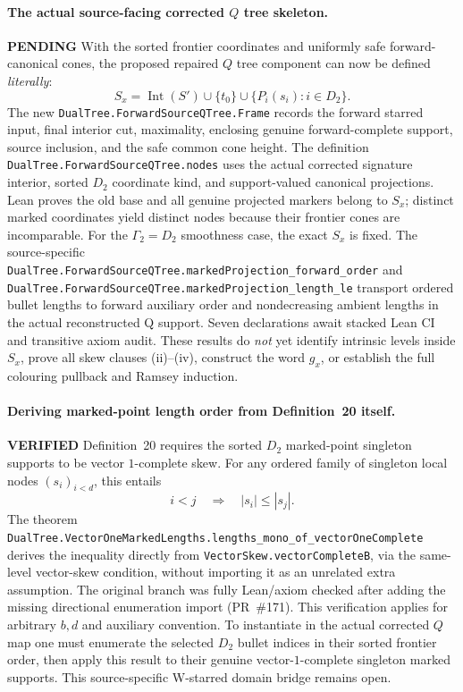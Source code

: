 \documentclass[11pt]{article}
\newcommand{\ok}{\textcolor{green!40!black}{\textbf{VERIFIED}}}
\newcommand{\todo}{\textcolor{gray!70!black}{\textbf{PENDING}}}
\newcommand{\lean}[1]{\texttt{#1}}
\begin{document}
\paragraph{The actual source-facing corrected $Q$ tree skeleton.} \todo
With the sorted frontier coordinates and
uniformly safe forward-canonical cones,
the proposed repaired $Q$ tree component
can now be defined \emph{literally}:
\[
 S_x=\operatorname{Int}(S')\cup\{t_0\}
 \cup\{P_i(s_i):i\in D_2\}.
\]
The new
\lean{DualTree.ForwardSourceQTree.Frame}
records the forward starred input,
final interior cut, maximality,
enclosing genuine forward-complete
support, source inclusion, and
the safe common cone height.
The definition
\lean{DualTree.ForwardSourceQTree.nodes}
uses the actual corrected signature
interior, sorted $D_2$ coordinate
kind, and support-valued canonical
projections.
Lean proves the old base and all
genuine projected markers belong
to $S_x$; distinct marked coordinates
yield distinct nodes because their
frontier cones are incomparable.
For the $\Gamma_2=D_2$ smoothness
case, the exact $S_x$ is fixed.
The source-specific
\lean{DualTree.ForwardSourceQTree.markedProjection_forward_order}
and
\lean{DualTree.ForwardSourceQTree.markedProjection_length_le}
transport ordered bullet lengths
to forward auxiliary order and
nondecreasing ambient lengths in
the actual reconstructed Q support.
Seven declarations await stacked
Lean CI and transitive axiom audit.
These results do \emph{not}
yet identify intrinsic levels
inside $S_x$, prove all skew
clauses (ii)--(iv), construct
the word $g_x$, or establish
the full colouring pullback
and Ramsey induction.

\paragraph{Deriving marked-point length order from Definition~20 itself.} \ok
Definition~20 requires the sorted $D_2$ marked-point
singleton supports to be vector $1$-complete skew.
For any ordered family of singleton local nodes
$(s_i)_{i<d}$, this entails
\[
 i<j\quad\Longrightarrow\quad |s_i|\le |s_j|.
\]
The theorem
\lean{DualTree.VectorOneMarkedLengths.lengths_mono_of_vectorOneComplete}
derives the inequality directly from
\lean{VectorSkew.vectorCompleteB}, via the same-level
vector-skew condition, without importing it as
an unrelated extra assumption.
The original branch was fully Lean/axiom checked
after adding the missing directional enumeration
import (PR~\#171). This verification applies for
arbitrary $b,d$ and auxiliary convention.
To instantiate in the actual corrected $Q$ map
one must enumerate the selected $D_2$
bullet indices in their sorted frontier
order, then apply this result to their
genuine vector-$1$-complete singleton
marked supports. This source-specific
W-starred domain bridge remains open.
\end{document}
